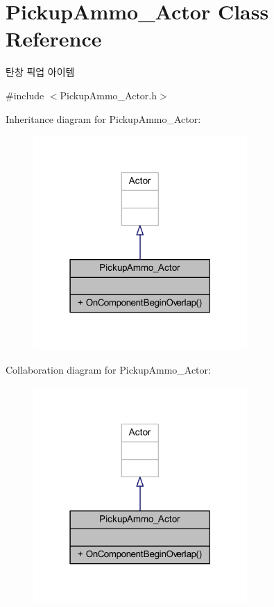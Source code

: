 \hypertarget{class_pickup_ammo___actor}{}\section{Pickup\+Ammo\+\_\+\+Actor Class Reference}
\label{class_pickup_ammo___actor}


탄창 픽업 아이템  




{\ttfamily \#include $<$Pickup\+Ammo\+\_\+\+Actor.\+h$>$}



Inheritance diagram for Pickup\+Ammo\+\_\+\+Actor\+:
\nopagebreak
\begin{figure}[H]
\begin{center}
\leavevmode
\includegraphics[width=231pt]{class_pickup_ammo___actor__inherit__graph}
\end{center}
\end{figure}


Collaboration diagram for Pickup\+Ammo\+\_\+\+Actor\+:
\nopagebreak
\begin{figure}[H]
\begin{center}
\leavevmode
\includegraphics[width=231pt]{class_pickup_ammo___actor__coll__graph}
\end{center}
\end{figure}
